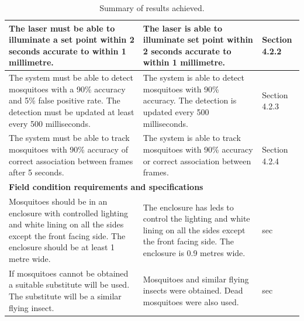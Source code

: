 \begin{table}[H]
\begin{tabularx}{\textwidth}{|X|X|l|}
    \hline
    The laser must be able to illuminate a set point within 2 seconds accurate to within 1 millimetre.                                                                           &
    The laser is able to illuminate set point within 2 seconds accurate to within 1 millimetre.                                                                                  &
    Section 4.2.2                                                                                                                                                                                                                                                                                                                                          \\
    \hline
    The system must be able to detect mosquitoes with a 90\% accuracy and 5\% false positive rate. The detection must be updated at least every 500 milliseconds.                & The system is able to detect mosquitoes with 90\% accuracy. The detection is updated every 500 milliseconds.                                            & Section 4.2.3 \\
    \hline
    The system must be able to track mosquitoes with 90\% accuracy of correct association between frames after 5 seconds.                                                        & The system is able to track mosquitoes with 90\% accuracy or correct association between frames.                                                        & Section 4.2.4 \\
    \hline
    \multicolumn{3}{|l|}{\textbf{Field condition requirements and specifications}}                                                                                                                                                                                                                                                                         \\
    \hline
    Mosquitoes should be in an enclosure with controlled lighting and white lining on all the sides except the front facing side. The enclosure should be at least 1 metre wide. & The enclosure has \glspl{led} to control the lighting and white lining on all the sides except the front facing side. The enclosure is 0.9 metres wide. & sec           \\
    \hline
    If mosquitoes cannot be obtained a suitable substitute will be used. The substitute will be a similar flying insect.                                                         & Mosquitoes and similar flying insects were obtained. Dead mosquitoes were also used.                                                                    & sec           \\
    \hline
  \end{tabularx}
  \caption{Summary of results achieved.}
  \label{tab:results_summary}
\end{table}

